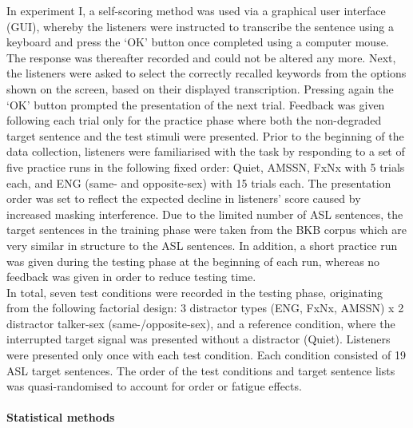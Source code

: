 \documentclass[a4paper, twoside]{templates/ociamthesis}
\begin{document}
In experiment I, a self-scoring method was used via a graphical user interface (GUI), whereby the listeners were instructed to transcribe the sentence using a keyboard and press the `OK' button once completed using a computer mouse. The response was thereafter recorded and could not be altered any more. Next, the listeners were asked to select the correctly recalled keywords from the options shown on the screen, based on their displayed transcription. Pressing again the `OK' button prompted the presentation of the next trial. Feedback was given following each trial only for the practice phase where both the non-degraded target sentence and the test stimuli were presented.
Prior to the beginning of the data collection, listeners were familiarised with the task by responding to a set of five practice runs in the following fixed order: Quiet, AMSSN, FxNx with 5 trials each, and ENG (same- and opposite-sex) with 15 trials each. The presentation order was set to reflect the expected decline in listeners' score caused by increased masking interference. Due to the limited number of ASL sentences, the target sentences in the training phase were taken from the BKB corpus \autocite{Bench1979} which are very similar in structure to the ASL sentences. In addition, a short practice run was given during the testing phase at the beginning of each run, whereas no feedback was given in order to reduce testing time.\\

In total, seven test conditions were recorded in the testing phase, originating from the following factorial design: 3 distractor types (ENG, FxNx, AMSSN) x 2 distractor talker-sex (same-/opposite-sex), and a reference condition, where the interrupted target signal was presented without a distractor (Quiet). Listeners were presented only once with each test condition. Each condition consisted of 19 ASL target sentences. The order of the test conditions and target sentence lists was quasi-randomised to account for order or fatigue effects.\\

\hypertarget{Exp1-Stats}{%
\paragraph{Statistical methods}\label{Exp1-Stats}}
\end{document}

